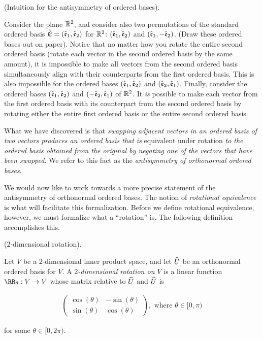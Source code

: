 \begin{deriv}
\label{ch::exterior_pwrs::deriv::ordered_bases_antisymmetry_intuition}
    (Intuition for the antisymmetry of ordered bases).
    
    Consider the plane $\mathbb{R}^2$, and consider also two permutations of the standard ordered basis ${\hat{\mathfrak{E}}} = (\hat{\mathfrak{e}}_1, \hat{\mathfrak{e}}_2)$ for $\mathbb{R}^2$: $(\hat{\mathfrak{e}}_1, \hat{\mathfrak{e}}_2)$ and $(\hat{\mathfrak{e}}_1, -\hat{\mathfrak{e}}_2)$. (Draw these ordered bases out on paper). Notice that no matter how you rotate the entire second ordered basis (rotate each vector in the second ordered basis by the same amount), it is impossible to make all vectors from the second ordered basis simultaneously align with their counterparts from the first ordered basis. This is also impossible for the ordered bases $(\hat{\mathfrak{e}}_1, \hat{\mathfrak{e}}_2)$ and $(\hat{\mathfrak{e}}_2, \hat{\mathfrak{e}}_1)$. Finally, consider the ordered bases $(\hat{\mathfrak{e}}_1, \hat{\mathfrak{e}}_2)$ and $(-\hat{\mathfrak{e}}_2, \hat{\mathfrak{e}}_1)$ of $\mathbb{R}^2$. It \textit{is} possible to make each vector from the first ordered basis with its counterpart from the second ordered basis by rotating either the entire first ordered basis or the entire second ordered basis.
    
    What we have discovered is that \textit{swapping adjacent vectors in an ordered basis of two vectors produces an ordered basis that is} equivalent under rotation \textit{to the ordered basis obtained from the original by negating one of the vectors that have been swapped}. We refer to this fact as the \textit{antisymmetry of orthonormal ordered bases}.
\end{deriv}

We would now like to work towards a more precise statement of the antisymmetry of orthonormal ordered bases. The notion of \textit{rotational equivalence} is what will facilitate this formalization. Before we define rotational equivalence, however, we must formalize what a ``rotation'' is. The following definition accomplishes this.

\begin{defn}
\label{ch::exterior_pwrs::defn::2-rotation}
    ($2$-dimensional rotation).
    
    Let $V$ be a $2$-dimensional inner product space, and let $\widehat{U}$ be an orthonormal ordered basis for $V$.
    A \textit{$2$-dimensional rotation on $V$} is a linear function $\RR_\theta:V \rightarrow V$ whose matrix relative to $\widehat{U}$ and $\widehat{U}$ is
    
    \begin{align*}
        \begin{pmatrix}
            \cos(\theta) & -\sin(\theta) \\
            \sin(\theta) & \cos(\theta)
        \end{pmatrix},
        \text{ where $\theta \in [0, \pi)$}
    \end{align*}
    
    for some $\theta \in [0, 2\pi)$.
\end{defn}

